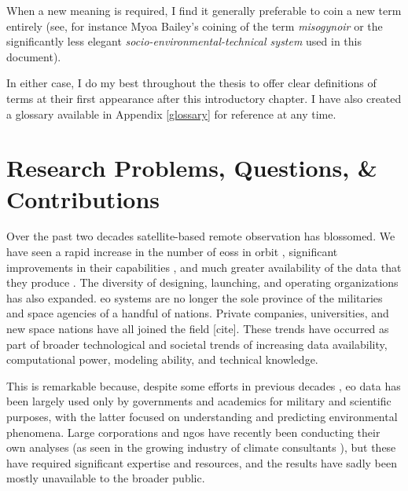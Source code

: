 When a new meaning is required, I find it generally preferable to coin a new term entirely (see, for instance Myoa Bailey's coining of the term \textit{misogynoir} \cite{baileyMoreOriginMisogynoir} or the significantly less elegant \textit{socio-environmental-technical system} used in this document).

In either case, I do my best throughout the thesis to offer clear definitions of terms at their first appearance after this introductory chapter. I have also created a glossary available in Appendix \ref{glossary} for reference at any time. 

\section{Research Problems, Questions, \& Contributions} \label{sec:questions}

Over the past two decades satellite-based remote observation has blossomed. We have seen a rapid increase in the number of \acp{eos} in orbit \cite{belwardWhoLaunchedWhat2015}, significant improvements in their capabilities \cite{jensenRemoteSensingEnvironment2006}, and much greater availability of the data that they produce \cite{borowitzOpenSpaceGlobal2017}. The diversity of designing, launching, and operating organizations has also expanded. \ac{eo} systems are no longer the sole province of the militaries and space agencies of a handful of nations. Private companies, universities, and new space nations have all joined the field [cite]. These trends have occurred as part of broader technological and societal trends of increasing data availability, computational power, modeling ability, and technical knowledge. 

This is remarkable because, despite some efforts in previous decades \cite{lightWarfareWelfareDefense2005}, \ac{eo} data has been largely used only by governments and academics for military and scientific purposes, with the latter focused on understanding and predicting environmental phenomena. Large corporations and \acp{ngo} have recently been conducting their own analyses (as seen in the growing industry of climate consultants \cite{cohenTop10Climate2011}), but these have required significant expertise and resources, and the results have sadly been mostly unavailable to the broader public.

